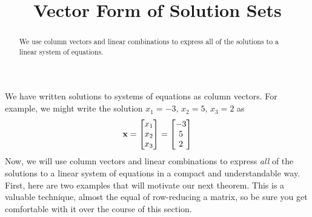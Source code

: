 \documentclass{ximera}
\title{Vector Form of Solution Sets}
\begin{document}
\begin{abstract}
  We use column vectors and linear combinations to express all of the
  solutions to a linear system of equations.
\end{abstract}
\maketitle

We have written solutions to systems of equations as column vectors.
For example, we might write the solution
$x_1 = -3,\,x_2 = 5,\,x_3 = 2$ as
\[
  \mathbf{x}=\begin{bmatrix}x_1\\x_2\\x_3\end{bmatrix}=\begin{bmatrix}-3\\5\\2\end{bmatrix}
\]
Now, we will use column vectors and linear combinations to express
\textit{all} of the solutions to a linear system of equations in a
compact and understandable way.  First, here are two examples that
will motivate our next theorem.  This is a valuable technique, almost
the equal of row-reducing a matrix, so be sure you get comfortable
with it over the course of this section.
\end{document}
